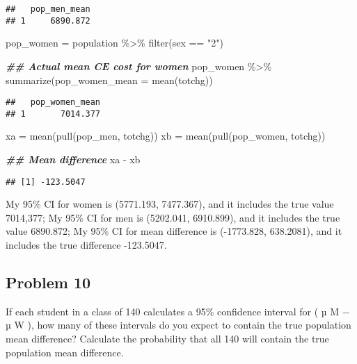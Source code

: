 \documentclass[
]{article}
\newenvironment{Shaded}{\begin{snugshade}}{\end{snugshade}}
\newcommand{\AttributeTok}[1]{\textcolor[rgb]{0.77,0.63,0.00}{#1}}
\newcommand{\DocumentationTok}[1]{\textcolor[rgb]{0.56,0.35,0.01}{\textbf{\textit{#1}}}}
\newcommand{\FunctionTok}[1]{\textcolor[rgb]{0.00,0.00,0.00}{#1}}
\newcommand{\NormalTok}[1]{#1}
\newcommand{\OtherTok}[1]{\textcolor[rgb]{0.56,0.35,0.01}{#1}}
\newcommand{\SpecialCharTok}[1]{\textcolor[rgb]{0.00,0.00,0.00}{#1}}
\newcommand{\StringTok}[1]{\textcolor[rgb]{0.31,0.60,0.02}{#1}}
\begin{document}
\begin{verbatim}
##   pop_men_mean
## 1     6890.872
\end{verbatim}

\begin{Shaded}
\begin{Highlighting}[]
\NormalTok{pop\_women }\OtherTok{=} 
\NormalTok{  population }\SpecialCharTok{\%\textgreater{}\%} 
  \FunctionTok{filter}\NormalTok{(sex }\SpecialCharTok{==} \StringTok{"2"}\NormalTok{) }

\DocumentationTok{\#\# Actual mean CE cost for women}
\NormalTok{pop\_women }\SpecialCharTok{\%\textgreater{}\%} 
  \FunctionTok{summarize}\NormalTok{(}\AttributeTok{pop\_women\_mean =} \FunctionTok{mean}\NormalTok{(totchg))}
\end{Highlighting}
\end{Shaded}

\begin{verbatim}
##   pop_women_mean
## 1       7014.377
\end{verbatim}

\begin{Shaded}
\begin{Highlighting}[]
\NormalTok{xa }\OtherTok{=} \FunctionTok{mean}\NormalTok{(}\FunctionTok{pull}\NormalTok{(pop\_men, totchg))}
\NormalTok{xb }\OtherTok{=} \FunctionTok{mean}\NormalTok{(}\FunctionTok{pull}\NormalTok{(pop\_women, totchg))}

\DocumentationTok{\#\# Mean difference}
\NormalTok{xa }\SpecialCharTok{{-}}\NormalTok{ xb}
\end{Highlighting}
\end{Shaded}

\begin{verbatim}
## [1] -123.5047
\end{verbatim}

My 95\% CI for women is (5771.193, 7477.367), and it includes the true
value 7014,377; My 95\% CI for men is (5202.041, 6910.899), and it
includes the true value 6890.872; My 95\% CI for mean difference is
(-1773.828, 638.2081), and it includes the true difference -123.5047.

\hypertarget{problem-10}{%
\subsection{Problem 10}\label{problem-10}}

If each student in a class of 140 calculates a 95\% confidence interval
for ( µ M − µ W ), how many of these intervals do you expect to contain
the true population mean difference? Calculate the probability that all
140 will contain the true population mean difference.
\end{document}
